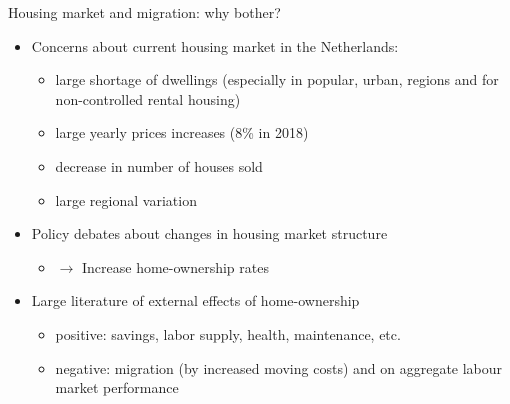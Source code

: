 \documentclass{beamer}
\begin{document}
\begin{frame}{Housing market and migration: why bother?}
   	\begin{itemize}
   		\item \alert{Concerns} about current housing market in the Netherlands:
   		\begin{itemize}
   			\item large \alert{shortage} of dwellings (especially in popular, urban, regions and for non-controlled rental housing)
   			\item large yearly prices \alert{increases} (8\% in 2018)
   			\item decrease in number of houses \alert{sold}
   			\item large \alert{regional} variation\newline
   		\end{itemize}
                \item Policy debates about changes in housing market \alert{structure}
                \begin{itemize}
                \item $\longrightarrow$ Increase home-ownership rates\newline
                \end{itemize}
   		\item Large literature of \alert{external} effects of home-ownership \citep{dietz2003social}
   		\begin{itemize}
   			\item \alert{positive}: savings, labor supply, health, maintenance, etc.
   			\item \alert{negative}: migration (by increased moving costs) and on aggregate labour market performance \citep{oswald1996conjecture,oswald1999housing}
   		\end{itemize}
   	\end{itemize}
\end{frame}
\end{document}
